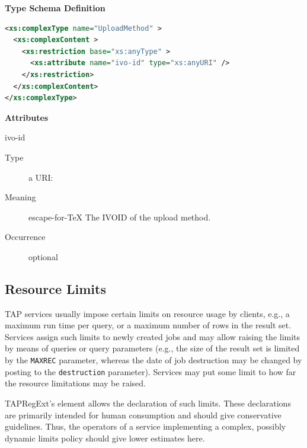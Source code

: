 \documentclass{ivoa}
\begin{document}
\vspace{1ex}\noindent\textbf{ Type Schema Definition}

\begin{lstlisting}[language=XML,basicstyle=\footnotesize]
<xs:complexType name="UploadMethod" >
  <xs:complexContent >
    <xs:restriction base="xs:anyType" >
      <xs:attribute name="ivo-id" type="xs:anyURI" />
    </xs:restriction>
  </xs:complexContent>
</xs:complexType>
\end{lstlisting}

\vspace{0.5ex}\noindent\textbf{ Attributes}

\begingroup\small\begin{bigdescription}
\item[ivo-id]
\begin{description}
\item[Type] a URI: 
\item[Meaning] escape-for-TeX{{{
            The IVOID of the upload method.
            }}}
\item[Occurrence] optional
\end{description}


\end{bigdescription}\endgroup

\endgroup

\subsection{Resource Limits}

\label{reslimits}

TAP services usually impose certain limits on resource usage by clients,
e.g., a maximum run time per query, or a maximum number of rows in the result
set.  Services assign such limits to newly created jobs and may
allow raising the limits by means of queries or query parameters (e.g., the
size of the result set is limited by the \texttt{MAXREC} parameter, whereas
the date of job destruction may be changed by posting to the
\texttt{destruction} parameter).  Services may put some limit to how
far the resource limitations may be raised.

TAPRegExt's  element allows the declaration of such limits.
These declarations are primarily intended for human consumption and should give
conservative guidelines.  Thus, the operators of a service implementing a
complex, possibly dynamic limits policy should give lower estimates here.
\end{document}

